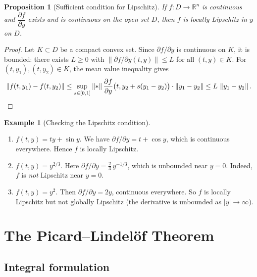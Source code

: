 \documentclass[12pt,a4paper,openany]{book}
\theoremstyle{definition}
\newtheorem{example}[definition]{Example}
\theoremstyle{plain}
\newtheorem{proposition}[definition]{Proposition}
\theoremstyle{remark}
\newcommand{\R}{\mathbb{R}}
\newcommand{\abs}[1]{\left|#1\right|}
\newcommand{\norm}[1]{\left\|#1\right\|}
\begin{document}
\begin{proposition}[Sufficient condition for Lipschitz]\label{prop:C1-lipschitz}
If $f\colon D \to \R^n$ is continuous and $\dfrac{\partial f}{\partial y}$
exists and is continuous on the open set $D$, then $f$ is locally Lipschitz
in $y$ on $D$.
\end{proposition}

\begin{proof}
Let $K \subset D$ be a compact convex set. Since $\partial f/\partial y$ is
continuous on $K$, it is bounded: there exists $L \ge 0$ with
$\norm{\partial f/\partial y(t,y)} \le L$ for all $(t,y) \in K$.
For $(t,y_1), (t,y_2) \in K$, the mean value inequality gives
\[
  \norm{f(t,y_1) - f(t,y_2)}
  \le \sup_{s \in [0,1]} \norm*{\frac{\partial f}{\partial y}\bigl(t, y_2 + s(y_1 - y_2)\bigr)}
       \cdot \norm{y_1 - y_2}
  \le L\,\norm{y_1 - y_2}. \qedhere
\]
\end{proof}

\begin{example}[Checking the Lipschitz condition]\label{ex:lipschitz-check}
\begin{enumerate}[label=(\alph*)]
\item $f(t,y) = ty + \sin y$. We have $\partial f/\partial y = t + \cos y$,
  which is continuous everywhere. Hence $f$ is locally Lipschitz.
\item $f(t,y) = y^{2/3}$. Here $\partial f/\partial y = \frac{2}{3}\,y^{-1/3}$,
  which is unbounded near $y=0$. Indeed, $f$ is \emph{not} Lipschitz near $y=0$.
\item $f(t,y) = y^2$. Then $\partial f/\partial y = 2y$, continuous everywhere.
  So $f$ is locally Lipschitz but not globally Lipschitz (the derivative is
  unbounded as $\abs{y} \to \infty$).
\end{enumerate}
\end{example}

\section{The Picard--Lindel\"of Theorem}\label{sec:picard-lindelof}

\subsection{Integral formulation}
\end{document}
